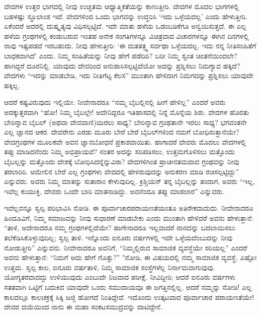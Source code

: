 ವೇದಗಳ ಉತ್ತರ ಭಾಗದಲ್ಲಿ ನೀವು ಉಚ್ಚತಮ ಆಧ್ಯಾತ್ಮಿಕತೆಯನ್ನು ಕಾಣುತ್ತೀರಿ. ವೇದಗಳ ಮೊದಲ ಭಾಗಗಳಲ್ಲಿ ಬಹಳಷ್ಟು ಸ್ಥೂಲಾಂಶ ಇದೆ. ವೇದಗಳಿಂದ ಒಂದು ಭಾಗವನ್ನು ಉದ್ಧರಿಸಿ ‘ಇದು ಒಳ್ಳೆಯದಲ್ಲ’ ಎಂದು ಹೇಳುತ್ತೀರಿ. ಏಕೆಂದರೆ ಅದರಲ್ಲಿ ದುಷ್ಕೃತ್ಯವು ವಿಧಿಸಲ್ಪಟ್ಟಿದೆ. ಇದೇ ಮಾತು ಹಳೆಯ ಒಡಂಬಡಿಕೆಗೂ ಅನ್ವಯಿಸುತ್ತದೆ. ಈ ಎಲ್ಲ ಹಳೆಯ ಗ್ರಂಥಗಳಲ್ಲಿ ಕಂಡುಬರುವ ಇಂತಹ ಅನೇಕ ಸಂಗತಿಗಳನ್ನೂ ವಿಚಿತ್ರವಾದ ವಿಚಾರಗಳನ್ನೂ ಈಗಿನ ದಿನಗಳಲ್ಲಿ ನಾವು ಇಷ್ಟಪಡದೆ ಇರಬಹುದು. ನೀವು ಹೇಳುತ್ತೀರಿ: ‘ಈ ಮತತತ್ತ್ವ ಸರ್ವಥಾ ಒಳ್ಳೆಯದಲ್ಲ. ಇದು ನನ್ನ ನೀತಿಸಂಹಿತೆಗೆ ಬಾಧಕವಾಗಿದೆ’ ಎಂದು. ನಿಮ್ಮ ಸಂಹಿತೆಯನ್ನು ನೀವು ಹೇಗೆ ಪಡೆದಿರಿ? ಬರೀ ನಿಮ್ಮ ಸ್ವಂತ ಚಿಂತನೆಯಿಂದಲೇ? ಹಾಗಿದ್ದರೆ ದೂರನಿಲ್ಲಿ. ಯಾವುದು ದೇವರಿಂದ ಅನುಶಾಸಿಸಲ್ಪಟ್ಟಿದೆಯೋ ಅದನ್ನು ಪ್ರಶ್ನಿಸಲು ನಿಮಗ್ಯಾವ ಹಕ್ಕಿದೆ? ವೇದಗಳು “ಇದನ್ನು ಮಾಡಬೇಡಿ, ಇದು ನೀತಿಗೆಟ್ಟ ಕೆಲಸ” ಮುಂತಾಗಿ ಹೇಳಿದಾಗ ನಿಮಗದನ್ನು ಪ್ರಶ್ನಿಸಲು ಯಾವುದೇ ಹಕ್ಕಿಲ್ಲ.

ಆದರೆ ಕಷ್ಟವಿರುವುದು ಇಲ್ಲಿಯೇ. ನೀವೇನಾದರೂ “ನಮ್ಮ ಬೈಬಲ್ಲಿನಲ್ಲಿ ಹೀಗೆ ಹೇಳಿಲ್ಲ” ಎಂದರೆ ಅವರು ಅದಕ್ಕುತ್ತರವಾಗಿ “ಹೋ! ನಿಮ್ಮ ಬೈಬಲ್ಲೇ! ಅದೇನಿದ್ದರೂ ಇತಿಹಾಸದಲ್ಲಿ ನಿನ್ನೆ ಮೊನ್ನೆಯ ಶಿಶು. ವೇದಗಳ ಹೊರತು ಬೇರಿನ್ನಾವ ಬೈಬಲ್ (ಅಥವಾ ದೇವವಾಣಿ)ಯಿರಲು ಸಾಧ್ಯ? ಬೇರಿನ್ನಾವ ಗ್ರಂಥತಾನೇ ಇರಲು ಸಾಧ್ಯ? ಭಗವಂತನೇ ಎಲ್ಲ ಜ್ಞಾನದ ಆಕರ. ದೇವರೇನು ಎರಡು ಮೂರು ಬೇರೆ ಬೇರೆ ಬೈಬಲ್‌ಗಳಿಂದ ನಮಗೆ ಬೋಧಿಸುತ್ತಾನೆಯೇ? ವೇದಗ್ರಂಥಗಳ ಮೂಲಕವೇ ಅವನ ಜ್ಞಾನಬೋಧನೆ ಪ್ರಕಾಶವಾಯಿತು. ಹಾಗಾದರೆ ದೇವರು ಮೊದಲು ವೇದಗಳಲ್ಲಿ ತಪ್ಪು ಮಾಡಿದನೆಂದು ನಿಮ್ಮ ಅಭಿಪ್ರಾಯವೆ? ನಂತರ ಅದನ್ನು ಸರಿಪಡಿಸಲು, ಉತ್ತಮಗೊಳಿಸಲು ಮತ್ತೊಂದು ಬೈಬಲ್ಲನ್ನು ಮತ್ತೊಂದು ದೇಶಕ್ಕೆ ಬೋಧಿಸಿದನ್ನೆನ್ನುವಿರಾ? ವೇದಗಳಿಗಿಂತ ಪ್ರಾಚೀನತಮವಾದ ಗ್ರಂಥವನ್ನು ನೀವು ತರಲಾರಿರಿ. ಆಮೇಲಿನ ಬೇರೆ ಎಲ್ಲ ಗ್ರಂಥಗಳು ವೇದದಲ್ಲಿ ಹೇಳಿರುವುದನ್ನು ಅನುಕರಣ ಮಾಡಿ ರಚಿಸಲ್ಪಟ್ಟಿದ್ದು” ಎನ್ನುವರು. ಅವರು ನಿಮ್ಮ ಮಾತನ್ನು ಸುತಾರಾಂ ಕೇಳುವುದಿಲ್ಲ. ಕ್ರಿಶ್ಚಿಯನ್ ತನ್ನ ಬೈಬಲ್ಲನ್ನು ತಂದಾಗ, ಅವರು “ಇಲ್ಲ, ಇವೆಲ್ಲ ಕುಯುಕ್ತಿ, ದೇವರು ಒಂದೇ ಬಾರಿ ಮಾತನಾಡಿದ್ದು. ಅವನೆಂದೂ ತಪ್ಪು ಮಾಡಲಾರ” ಎನ್ನುವರು.

ಇವೆಲ್ಲವನ್ನೂ ಸ್ವಲ್ಪ ಪರಿಭಾವಿಸಿ ನೋಡಿ. ಈ ಪೂರ್ವಾಚಾರಪರಾಯಣತೆಯಂತೂ ಅತಿರೇಕವಾದುದು. ನೀವೇನಾದರೂ ಹಿಂದೂವಿಗೆ, ನಿಮ್ಮ ಸಮಾಜವನ್ನು ನೀವು ಸುಧಾರಣೆ ಮಾಡಬೇಕು ಎಂದು ಮುಂತಾಗಿ ಹೇಳಿದರೆ ಅವನು ಹೇಳುತ್ತಾನೆ: “ತಾಳಿ, ಅದೇನಾದರೂ ನಮ್ಮ ಗ್ರಂಥಗಳಲ್ಲಿದೆಯೇ? ಹಾಗೇನಾದರೂ ಇಲ್ಲವಾದರೆ ನಾನದನ್ನು ಬದಲಾಯಿಸಲು ತಲೆಕೆಡಿಸಿಕೊಳ್ಳುವುದಿಲ್ಲ; ಸ್ವಲ್ಪ ತಾಳಿ. ಇನ್ನೊಂದು ಐನೂರು ವರ್ಷಗಳಲ್ಲಿ ಇದೇ ಒಳ್ಳೆಯದೆಂಬುದನ್ನು ನೀವು ನೋಡುತ್ತೀರಿ” ಎನ್ನುವನು. ನೀವೇನಾದರೂ ಅವನಿಗೆ, “ನಿಮ್ಮಲ್ಲಿರುವ ಸಾಮಾಜಿಕ ವ್ಯವಸ್ಥೆಯೇ ಸರಿಯಲ್ಲ” ಎಂದರೆ ಅವನು ಹೇಳುತ್ತಾನೆ: “ನಿಮಗೆ ಅದು ಹೇಗೆ ಗೊತ್ತು?” "ನೋಡಿ, ಈ ವಿಷಯದಲ್ಲಿ ನಮ್ಮ ಸಾಮಾಜಿಕ ವ್ಯವಸ್ಥೆ, ಎಷ್ಟೋ ಉತ್ತಮ. ಸ್ವಲ್ಪ ಕಾಲ, ಐನೂರು ವರ್ಷತಾಳಿ, ನಿಮ್ಮ ಸಾಮಾಜಿಕ ಸಂಸ್ಥೆಗಳೆಲ್ಲ ನಿರ್ನಾಮವಾಗುವುವು. ಯೋಗ್ಯತರವಾದದ್ದು ಉಳಿಯುವುದು ಎಂಬುದೇ ನಿಜವಾದ ಪರೀಕ್ಷೆ. ನೀವಿದ್ದೀರಿ; ಆದರೆ ಐನೂರು ವರ್ಷಗಳು ಸತತವಾಗಿ ಒಟ್ಟಿಗೆ ಬದುಕಿದ ಯಾವುದೇ ಒಂದು ಸಮುದಾಯವೂ ಈ ಜಗತ್ತಿನಲ್ಲಿಲ್ಲ. ಆದರೆ ನಮ್ಮನ್ನು ನೋಡಿ! ಎಲ್ಲ ಕಾಲದಲ್ಲೂ ಕಾಲಚಕ್ರಕ್ಕೆ ಸಿಕ್ಕಿ ಜಜ್ಜಿ ಹೋಗದೆ ನಿಂತಿದ್ದೇವೆ. ಇದೊಂದು ಉತ್ಕಟವಾದ ಪೂರ್ವಾಚಾರ ಪರಾಯಣತೆಯೇ! ದೇವರ ದಯೆಯಿಂದ ನಾನು ಈ ಮಹಾ ಸಂಕಟಸಮುದ್ರವನ್ನು ದಾಟಿದ್ದೇನೆ.

